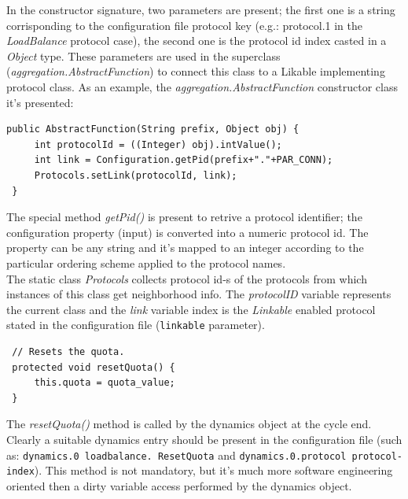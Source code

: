 \documentclass[a4paper,12pt]{article}
\begin{document}
In the constructor signature, two parameters are present; the first
one is a string corrisponding to the configuration file protocol key
(e.g.: protocol.1 in the \emph{LoadBalance} protocol case), the second
one is the protocol id index casted in a \emph{Object} type. These
parameters are used in the superclass (\emph{aggregation.AbstractFunction})
to connect this class to a Likable implementing protocol class. As
an example, the \emph{aggregation.AbstractFunction} constructor class
it's presented:\\

\footnotesize
\begin{verbatim}
public AbstractFunction(String prefix, Object obj) {
     int protocolId = ((Integer) obj).intValue();
     int link = Configuration.getPid(prefix+"."+PAR_CONN);
     Protocols.setLink(protocolId, link);
 }
\end{verbatim}
\normalsize


The special method \emph{getPid()} is present to retrive a protocol
identifier; the configuration property (input) is converted into a 
numeric protocol id. The property can be any string and it's mapped to
an integer according to the particular ordering scheme applied to the
protocol names.\\
The static class \emph{Protocols} collects protocol id-s of the protocols
from which instances of this class get neighborhood info. The \emph{protocolID}
variable represents the current class and the \emph{link} variable
index is the \emph{Linkable} enabled protocol stated in the configuration
file (\texttt{linkable} parameter).\\

\footnotesize
\begin{verbatim}
 // Resets the quota. 
 protected void resetQuota() {
     this.quota = quota_value;
 }
\end{verbatim}
\normalsize

The \emph{resetQuota()} method is called by the dynamics object at
the cycle end. Clearly a suitable dynamics entry should be present
in the configuration file (such as: \texttt{dynamics.0 loadbalance. 
ResetQuota}
and \texttt{dynamics.0.protocol protocol-index}). This method is not
mandatory, but it's much more software engineering oriented then a
dirty variable access performed by the dynamics object.\\
\end{document}

